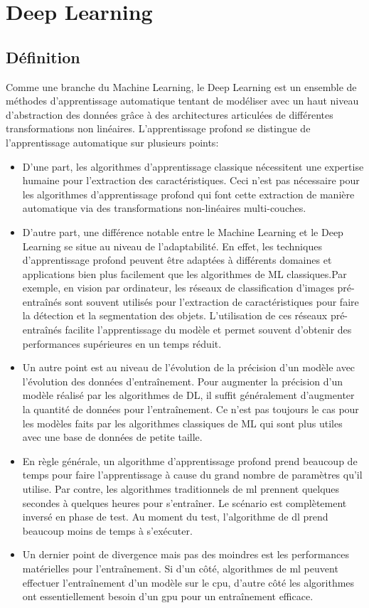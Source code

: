 \section{Deep Learning}
    \subsection{Définition}
    Comme une branche du Machine Learning, le Deep Learning est un ensemble de méthodes d'apprentissage automatique tentant de modéliser avec un haut niveau d’abstraction des données grâce à des architectures articulées de différentes transformations non linéaires. L’apprentissage profond se distingue de l’apprentissage automatique sur plusieurs points:
    \begin{itemize}
        \item D’une part, les algorithmes d’apprentissage classique nécessitent une expertise humaine pour l’extraction des caractéristiques. Ceci n’est pas nécessaire pour les algorithmes d’apprentissage profond qui font cette extraction de manière automatique via des transformations non-linéaires multi-couches.
        \item D’autre part, une différence notable entre le Machine Learning et le Deep Learning se situe au niveau de l’adaptabilité. En effet, les techniques d’apprentissage profond peuvent être adaptées à différents domaines et applications bien plus facilement que les algorithmes de ML classiques.Par exemple, en vision par ordinateur, les réseaux de classification d’images pré-entraînés sont souvent utilisés pour l’extraction de caractéristiques pour faire la détection et la segmentation des objets. L’utilisation de ces réseaux pré-entraînés facilite l’apprentissage du modèle et permet souvent d’obtenir des performances supérieures en un temps réduit.
        \item Un autre point est au niveau de l’évolution de la précision d’un modèle avec l’évolution des données d’entraînement. Pour augmenter la précision d’un modèle réalisé par les algorithmes de DL, il suffit généralement d’augmenter la quantité de données pour l’entraînement. Ce n’est pas toujours le cas pour les modèles faits par les algorithmes classiques de ML qui sont plus utiles avec une base de données de petite taille. 
        \item En règle générale, un algorithme d’apprentissage profond prend beaucoup de temps pour faire l’apprentissage à cause du grand nombre de paramètres qu’il utilise. Par contre, les algorithmes traditionnels de \acrshort{ml} prennent quelques secondes à quelques heures pour s’entraîner. Le scénario est complètement inversé en phase de test. Au moment du test, l’algorithme de \acrshort{dl} prend beaucoup moins de temps à s’exécuter. \cite{dahmaneThesis}
        \item Un dernier point de divergence mais pas des moindres est les performances matérielles pour l’entraînement. Si d’un côté, algorithmes de \acrshort{ml} peuvent effectuer l'entraînement d’un modèle sur le \acrshort{cpu}, d’autre côté les algorithmes ont essentiellement besoin d’un \acrshort{gpu} pour un entraînement efficace.
    \end{itemize}
